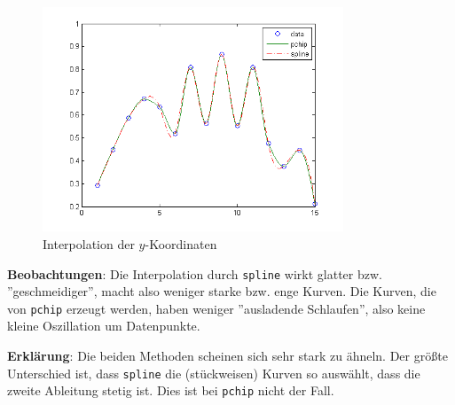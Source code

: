 \documentclass[11pt,a4paper,ngerman]{article}
\begin{document}
\begin{figure}[h]
\centering
\includegraphics[width=0.8\textwidth]{plotY.png}
\caption{Interpolation der $y$-Koordinaten\label{abb:2}}
\end{figure}

\textbf{Beobachtungen}: Die Interpolation durch \texttt{spline} wirkt glatter bzw. ''geschmeidiger'',
macht also weniger starke bzw. enge Kurven. Die Kurven, die von \texttt{pchip} erzeugt werden, haben
weniger ''ausladende Schlaufen'', also keine kleine Oszillation um Datenpunkte.

\textbf{Erklärung}: Die beiden Methoden scheinen sich sehr stark zu ähneln. Der größte Unterschied ist,
dass \texttt{spline} die (stückweisen) Kurven so auswählt, dass die zweite Ableitung stetig ist.
Dies ist bei \texttt{pchip} nicht der Fall.
\label{LastPage}
\end{document}
